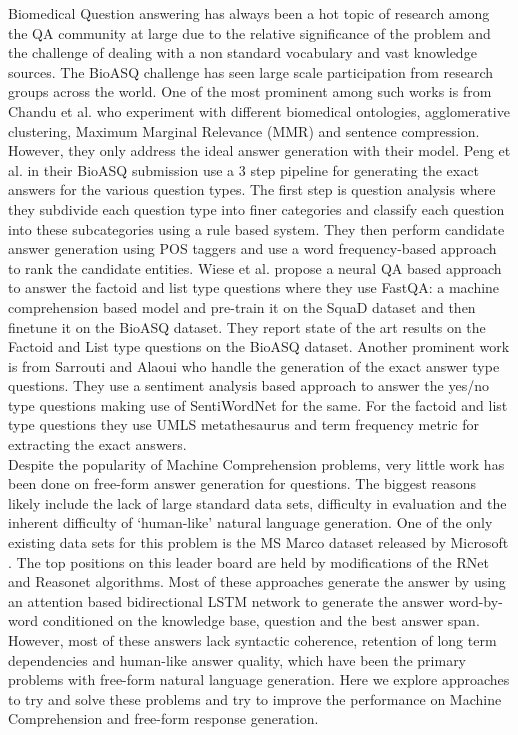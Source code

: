 Biomedical Question answering has always been a hot topic of research among the QA community at large due to the relative significance of the problem and the challenge of dealing with a non standard vocabulary and vast knowledge sources. The BioASQ challenge has seen large scale participation from research groups across the world. One of the most prominent among such works is from Chandu et al.  who experiment with different biomedical ontologies, agglomerative clustering, Maximum Marginal Relevance (MMR) and sentence compression. However, they only address the ideal answer generation with their model. Peng et al.  in their BioASQ submission use a 3 step pipeline for generating the exact answers for the various question types. The first step is question analysis where they subdivide each question type into finer categories and classify each question into these subcategories using a rule based system. They then perform candidate answer generation using POS taggers and use a word frequency-based approach to rank the candidate entities. Wiese et al.  propose a neural QA based approach to answer the factoid and list type questions where they use FastQA: a machine comprehension based model \cite{fastqa-squad} and pre-train it on the SquaD dataset \cite{squad} and then finetune it on the BioASQ dataset. They report state of the art results on the Factoid and List type questions on the BioASQ dataset. Another prominent work is from Sarrouti and Alaoui  who handle the generation of the exact answer type questions. They use a sentiment analysis based approach to answer the yes/no type questions making use of SentiWordNet for the same. For the factoid and list type questions they use UMLS metathesaurus and term frequency metric for extracting the exact answers. \\ %

Despite the popularity of Machine Comprehension problems, very little work has been done on free-form answer generation for questions. The biggest reasons likely include the lack of large standard data sets, difficulty in evaluation and the inherent difficulty of `human-like' natural language generation. One of the only existing data sets for this problem is the MS Marco dataset released by Microsoft \cite{msmarco}. The top positions on this leader board are held by modifications of the RNet \cite{Rnet} and Reasonet \cite{Reasonet} algorithms. Most of these approaches generate the answer by using an attention based bidirectional LSTM network to generate the answer word-by-word conditioned on the knowledge base, question and the best answer span. However, most of these answers lack syntactic coherence, retention of long term dependencies and human-like answer quality, which have been the primary problems with free-form natural language generation. Here we explore approaches to try and solve these problems and try to improve the performance on Machine Comprehension and free-form response generation.\\

